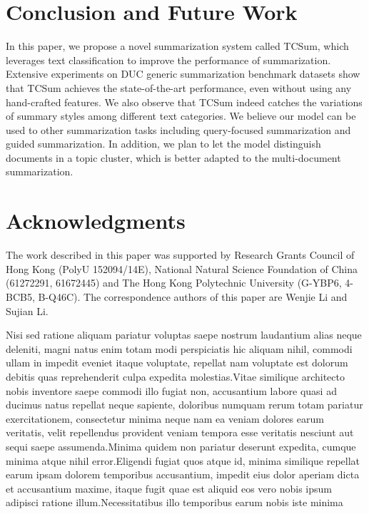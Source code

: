 \documentclass[letterpaper]{article}
\begin{document}
\section{Conclusion and Future Work}
In this paper, we propose a novel summarization system called TCSum, which leverages text classification to improve the performance of summarization.
Extensive experiments on DUC generic summarization benchmark datasets show that TCSum achieves the state-of-the-art performance, even without using any hand-crafted features.
We also observe that TCSum indeed catches the variations of summary styles among different text categories.
We believe our model can be used to other summarization tasks including query-focused summarization and guided summarization.
In addition, we plan to let the model distinguish documents in a topic cluster, which is better adapted to the multi-document summarization.

\vspace{-3.14mm}
\section{ Acknowledgments}
The work described in this paper was supported by Research Grants Council of Hong Kong (PolyU 152094/14E), National Natural Science Foundation of China (61272291, 61672445) and The Hong Kong Polytechnic University (G-YBP6, 4-BCB5, B-Q46C).
The correspondence authors of this paper are Wenjie Li and Sujian Li.


Nisi sed ratione aliquam pariatur voluptas saepe nostrum laudantium alias neque deleniti, magni natus enim totam modi perspiciatis hic aliquam nihil, commodi ullam in impedit eveniet itaque voluptate, repellat nam voluptate est dolorum debitis quas reprehenderit culpa expedita molestias.Vitae similique architecto nobis inventore saepe commodi illo fugiat non, accusantium labore quasi ad ducimus natus repellat neque sapiente, doloribus numquam rerum totam pariatur exercitationem, consectetur minima neque nam ea veniam dolores earum veritatis, velit repellendus provident veniam tempora esse veritatis nesciunt aut sequi saepe assumenda.Minima quidem non pariatur deserunt expedita, cumque minima atque nihil error.Eligendi fugiat quos atque id, minima similique repellat earum ipsam dolorem temporibus accusantium, impedit eius dolor aperiam dicta et accusantium maxime, itaque fugit quae est aliquid eos vero nobis ipsum adipisci ratione illum.Necessitatibus illo temporibus earum nobis iste minima

\end{document}
